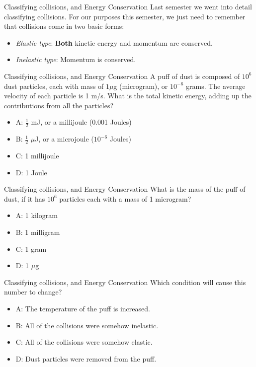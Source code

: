 \documentclass{beamer}
\begin{document}
\begin{frame}{Classifying collisions, and Energy Conservation}
Last semester we went into detail \alert{classifying collisions}.  For our purposes this semester, we just need to remember that collisions come in two basic forms:
\begin{itemize}
\item \textit{Elastic type}: \textbf{Both} kinetic energy and momentum are conserved.
\item \textit{Inelastic type}: Momentum is conserved.
\end{itemize}
\end{frame}

\begin{frame}{Classifying collisions, and Energy Conservation}
A puff of dust is composed of $10^6$ dust particles, each with mass of $1 \mu$g (microgram), or $10^{-6}$ grams.  The average velocity of each particle is 1 m/s.  What is the total kinetic energy, adding up the contributions from all the particles?
\begin{itemize}
\item A: $\frac{1}{2}$ mJ, or a millijoule (0.001 Joules)
\item B: $\frac{1}{2}$ $\mu$J, or a microjoule ($10^{-6}$ Joules)
\item C: 1 millijoule
\item D: 1 Joule
\end{itemize}
\end{frame}

\begin{frame}{Classifying collisions, and Energy Conservation}
What is the mass of the puff of dust, if it has $10^6$ particles each with a mass of 1 microgram?  
\begin{itemize}
\item A: 1 kilogram
\item B: 1 milligram
\item C: 1 gram
\item D: 1 $\mu$g
\end{itemize}
\end{frame}

\begin{frame}{Classifying collisions, and Energy Conservation}
Which condition will cause this number to change?
\begin{itemize}
\item A: The temperature of the puff is increased.
\item B: All of the collisions were somehow inelastic.
\item C: All of the collisions were somehow elastic.
\item D: Dust particles were removed from the puff.
\end{itemize}
\end{frame}
\end{document}
